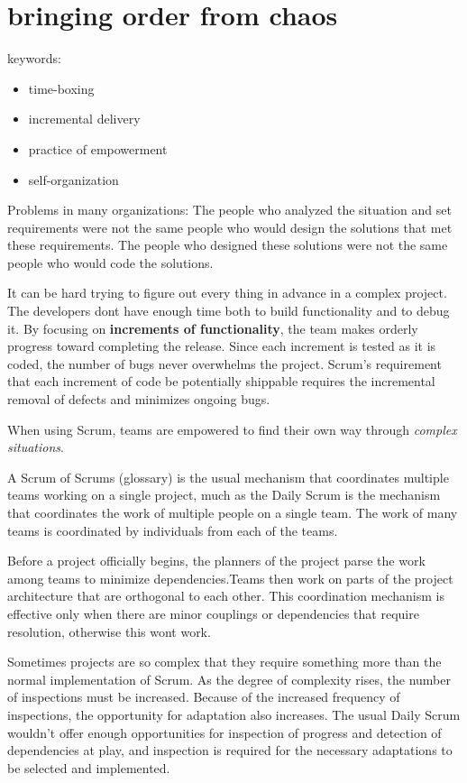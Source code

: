 \pagebreak
\chapter{bringing order from chaos}

keywords: 
\begin{itemize}
  \item time-boxing
  \item incremental delivery
  \item practice of empowerment
  \item self-organization
\end{itemize}

Problems in many organizations: The people who analyzed the situation and set requirements were not the same people who would design the solutions that met these requirements. The people who designed these solutions were not the same people who would code the solutions. 

It can be hard trying to figure out every thing in advance in a complex project. The developers dont have enough time both to build functionality and to debug it. By focusing on \textbf{increments of functionality}, the team makes orderly  progress toward completing the release. Since each increment is tested as it is coded, the number of bugs never overwhelms the project. Scrum’s requirement that each increment of code be potentially shippable requires the  incremental removal of defects and minimizes ongoing bugs.

When using Scrum, teams are empowered to find their own way through \textit{complex situations}.

A Scrum of Scrums (glossary) is the usual mechanism that coordinates multiple teams working on a single project, much as the Daily Scrum is the mechanism that coordinates the work of multiple people on a single team. The work of many teams is coordinated by individuals from each of the teams.

Before a project officially begins, the planners of the project parse the work among teams to minimize dependencies.Teams then work on parts of the project architecture that are orthogonal to each other. This coordination mechanism is effective only when there are minor couplings or dependencies that require resolution, otherwise this wont work.

Sometimes projects are so complex that they require something more than the normal implementation of Scrum. As the degree of complexity rises, the number of inspections must be increased. Because of the increased frequency of inspections, the opportunity for adaptation also increases. The usual Daily Scrum wouldn’t offer enough opportunities for inspection of progress and detection of dependencies at play, and inspection is required for the necessary adaptations to be selected and implemented.

